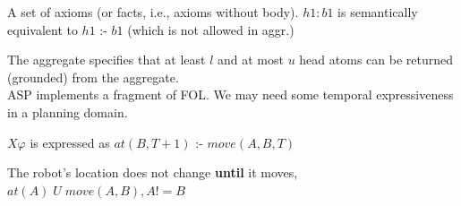 A set of axioms (or facts, i.e., axioms without body). $h1 : b1$ is semantically equivalent to $h1$ :- $b1$ (which is not allowed in aggr.)

The aggregate specifies that at least $l$ and at most $u$ head atoms can be returned (grounded) from the aggregate.\\



ASP implements a fragment of FOL. We may need some temporal expressiveness in a planning domain.

$X\varphi$ is expressed as $at(B,T+1)$ :- $move(A,B,T)$

The robot's location does not change \textbf{until} it moves, $at(A)\; U\;move(A,B), A!=B$




